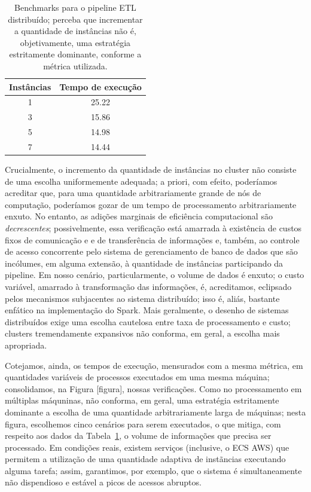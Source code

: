 \documentclass[12pt,oneside,a4paper]{article}
\begin{document}
\begin{table} 
	\centering 
	\begin{tabular}{c | c} 
		Instâncias & Tempo de execução \\
		\hline 
		1 & 25.22 \\ 
		3 & 15.86 \\ 
		5 & 14.98 \\ 
		7 & 14.44 \\ 
		\hline 
	\end{tabular}
	\caption{Benchmarks para o pipeline ETL distribuído; perceba que incrementar a quantidade de instâncias não é, objetivamente, uma estratégia estritamente dominante, conforme a métrica utilizada.} 
	\label{tab:benchmarks} 
\end{table} 

Crucialmente, o incremento da quantidade de instâncias no cluster não consiste de uma escolha uniformemente adequada; a priori, com efeito, poderíamos acreditar que, para uma quantidade arbitrariamente grande de nós de computação, poderíamos gozar de um tempo de processamento arbitrariamente enxuto. No entanto, as adições marginais de eficiência computacional são \textit{decrescentes}; possivelmente, essa verificação está amarrada à existência de custos fixos de comunicação e e de transferência de informações e, também, ao controle de acesso concorrente pelo sistema de gerenciamento de banco de dados que são incólumes, em alguma extensão, à quantidade de instâncias participando da pipeline. Em nosso cenário, particularmente, o volume de dados é enxuto; o custo variável, amarrado à transformação das informações, é, acreditamos, eclipsado pelos mecanismos subjacentes ao sistema distribuído; isso é, aliás, bastante enfático na implementação do Spark. Mais geralmente, o desenho de sistemas distribuídos exige uma escolha cautelosa entre taxa de processamento e custo; clusters tremendamente expansivos não conforma, em geral, a escolha mais apropriada. 

Cotejamos, ainda, os tempos de execução, mensurados com a mesma métrica, em quantidades variáveis de processos executados em uma mesma máquina; consolidamos, na Figura [figura], nossas verificações. Como no processamento em múltiplas máquninas, não conforma, em geral, uma estratégia estritamente dominante a escolha de uma quantidade arbitrariamente larga de máquinas; nesta figura, escolhemos cinco cenários para serem executados, o que mitiga, com respeito aos dados da Tabela~\ref{tab:benchmarks}, o volume de informações que precisa ser processado. Em condições reais, existem serviços (inclusive, o ECS AWS) que permitem a utilização de uma quantidade adaptiva de instãncias executando alguma tarefa; assim, garantimos, por exemplo, que o sistema é simultaneamente não dispendioso e estável a picos de acessos abruptos. 
\end{document}
